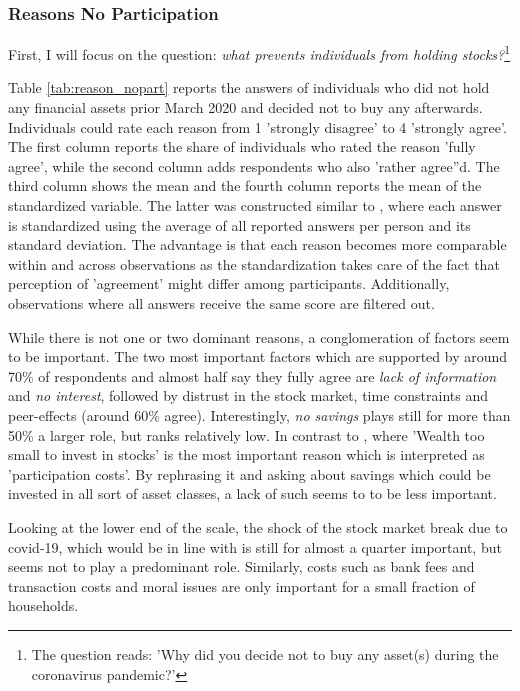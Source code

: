 \documentclass[ProjectABM]{subfiles}
\begin{document}
\subsubsection{Reasons No Participation}
First, I will focus on the question: \textit{what prevents individuals from holding stocks?}\footnote{The question reads: 'Why did you decide not to buy any asset(s) during the coronavirus pandemic?'} 

Table \ref{tab:reason_nopart} reports the answers of individuals who did not hold any financial assets prior March 2020 and decided not to buy any afterwards. Individuals could rate each reason from 1 'strongly disagree' to 4 'strongly agree'. The first column reports the share of individuals who rated the reason 'fully agree', while the second column adds respondents who also 'rather agree''d. The third column shows the mean and the fourth column reports the mean of the standardized variable. The latter was constructed similar to \cite{choi_2020}, where each answer is standardized using the average of all reported answers per person and its standard deviation. The advantage is that each reason becomes more comparable within and across observations as the standardization takes care of the fact that perception of 'agreement' might differ among participants. Additionally, observations where all answers receive the same score are filtered out.

While there is not one or two dominant reasons, a conglomeration of factors seem to be important. The two most important factors which are supported by around 70\% of respondents and almost half say they fully agree are \textit{lack of information} and \textit{no interest}, followed by distrust in the stock market, time constraints and peer-effects (around 60\% agree). Interestingly, \textit{no savings} plays still for more than 50\% a larger role, but ranks relatively low. In contrast to \cite{choi_2020}, where 'Wealth too small to invest in stocks' is the most important reason which is interpreted as 'participation costs'. By rephrasing it and asking about savings which could be invested in all sort of asset classes, a lack of such seems to to be less important.

Looking at the lower end of the scale, the shock of the stock market break due to covid-19, which would be in line with \cite{malmendier_2011} is still for almost a quarter important, but seems not to play a predominant role. Similarly, costs such as bank fees and transaction costs and moral issues are only important for a small fraction of households.
\end{document}
